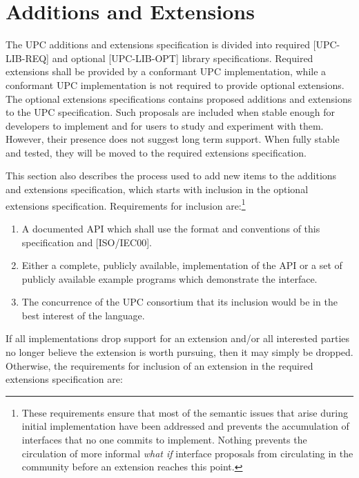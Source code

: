 \pagebreak
\section{Additions and Extensions}


\np The UPC additions and extensions specification is divided into required
    [UPC-LIB-REQ] and optional [UPC-LIB-OPT] library specifications.  Required extensions shall be provided by
    a conformant UPC implementation, while a conformant UPC implementation is
    not required to provide optional extensions.
    The optional extensions specifications contains proposed additions and extensions to the UPC
    specification.  Such proposals are included when stable enough for
    developers to implement and for users to study and experiment with
    them.  However, their presence does not suggest long term support.
    When fully stable and tested, they will be moved to the required extensions
    specification.

\np This section also describes the process used to add new items to the
    additions and extensions specification, which starts with inclusion in the
    optional extensions specification.  Requirements
    for inclusion are:\footnote{These requirements ensure that most of
    the semantic issues that arise during initial implementation have
    been addressed and prevents the accumulation of interfaces that no
    one commits to implement. Nothing prevents the circulation of more
    informal {\em what if} interface proposals from circulating in the
    community before an extension reaches this point.}

\begin{enumerate}
\item A documented API which shall use the format and conventions of
    this specification and [ISO/IEC00].

\item Either a complete, publicly available, implementation of the API
    or a set of publicly available example programs which demonstrate
    the interface.
    
\item The concurrence of the UPC consortium that its inclusion would be
    in the best interest of the language.    
\end{enumerate}

\np If all implementations drop support for an extension and/or all interested parties
    no longer believe the extension is worth pursuing, then it may simply be dropped.
    Otherwise, the requirements for inclusion of an extension in the required
    extensions specification are:

